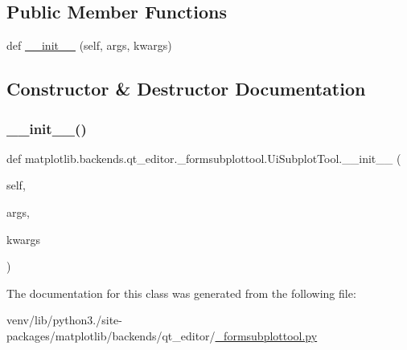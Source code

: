 \subsection*{Public Member Functions}
\begin{DoxyCompactItemize}
\item 
def \hyperlink{classmatplotlib_1_1backends_1_1qt__editor_1_1__formsubplottool_1_1UiSubplotTool_a83363e7f9b46a351886834c22ac3d2a2}{\+\_\+\+\_\+init\+\_\+\+\_\+} (self, args, kwargs)
\end{DoxyCompactItemize}


\subsection{Constructor \& Destructor Documentation}
\mbox{\label{classmatplotlib_1_1backends_1_1qt__editor_1_1__formsubplottool_1_1UiSubplotTool_a83363e7f9b46a351886834c22ac3d2a2}} 
\subsubsection{\texorpdfstring{\+\_\+\+\_\+init\+\_\+\+\_\+()}{\_\_init\_\_()}}
{\footnotesize\ttfamily def matplotlib.\+backends.\+qt\+\_\+editor.\+\_\+formsubplottool.\+Ui\+Subplot\+Tool.\+\_\+\+\_\+init\+\_\+\+\_\+ (\begin{DoxyParamCaption}\item[{}]{self,  }\item[{}]{args,  }\item[{}]{kwargs }\end{DoxyParamCaption})}



The documentation for this class was generated from the following file\+:\begin{DoxyCompactItemize}
\item 
venv/lib/python3./site-\/packages/matplotlib/backends/qt\+\_\+editor/\hyperlink{__formsubplottool_8py}{\+\_\+formsubplottool.\+py}\end{DoxyCompactItemize}
